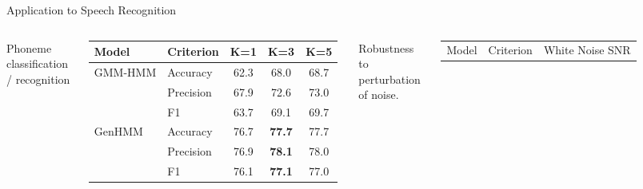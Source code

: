 \begin{frame}[label=current]{Application to Speech Recognition}
  \begin{columns}
    \centering
  {Phoneme classification / recognition}
  \begin{table}
    \centering
    \begin{adjustbox}{width=0.8\textwidth}
    \begin{tabular}{llccc}
      \toprule
      {Model} & Criterion &  K=1 &  K=3 &  K=5  \\  \midrule
      \multirow{3}{*}{GMM-HMM}
              & Accuracy    & 62.3 &  68.0 &  68.7  \\
              & {Precision} & 67.9 &  72.6 &  73.0  \\
              & {F1}        & 63.7 &  69.1 &  69.7 \\
      \midrule
      \multirow{3}{*}{GenHMM}
              & Accuracy    & 76.7   & \textbf{77.7} &  {77.7} \\ 
              & {Precision} & 76.9   & \textbf{78.1} &  78.0 \\
              & {F1}        & 76.1   & \textbf{77.1} &  77.0\\
      \bottomrule                                                                  
    \end{tabular}
    \end{adjustbox}
  \end{table}
  \centering
  Robustness to perturbation of noise.
  \begin{table}
    \centering
    \begin{adjustbox}{width=0.90\textwidth}
    \begin{tabular}{llcccc}
      \toprule
      \multirow{2}{*}{Model} & \multirow{2}{*}{Criterion} &
                                                            \multicolumn{4}{c}{White Noise SNR} \\
      

\end{tabular}
\end{adjustbox}
\end{table}
\end{columns}
\end{frame}
